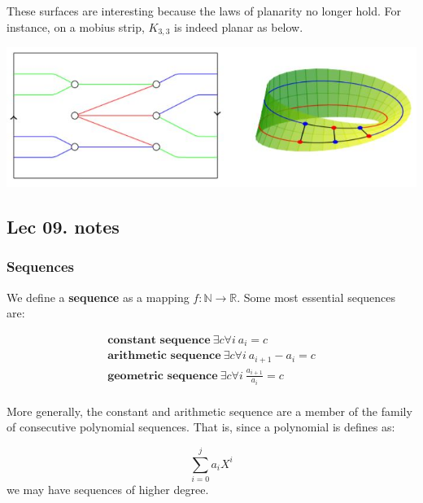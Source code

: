 \documentclass[titlepage]{article}
\theoremstyle{definition}
\numberwithin{equation}{subsection}
\numberwithin{remark}{subsection}
\begin{document}
These surfaces are interesting because the laws of planarity no longer hold. For instance, on a mobius strip, $K_{3,3}$ is indeed planar as below. 

 \begin{tcolorbox}[drop shadow, title=($K_{3,3}$ has become planar),lower separated=true]
    \centering
        \includegraphics[scale = 0.9,valign=t]{epflLectureNotes/advancedComputation/figures/mobiusk3.JPG}
\end{tcolorbox}

\subsection{Lec 09. notes}
\subsubsection{Sequences}
We define a \textbf{sequence} as a mapping $f: \mathbb{N} \to \mathbb{R}$. Some most essential sequences are:

\begin{align*}
    \textbf{constant sequence} \ \exists c \forall i \ a_{i} = c\\
    \textbf{arithmetic sequence} \ \exists c \forall i \ a_{i+1} - a_{i}  = c\\
    \textbf{geometric sequence} \ \exists c \forall i \ \frac{a_{i+1}}{a_{i}}= c
\end{align*}
\\
More generally, the constant and arithmetic sequence are a member of the family of consecutive polynomial sequences. That is, since a polynomial is defines as:

$$\sum_{i=0}^{j} a_{i}X^{i}$$ we may have sequences of higher degree. 
\end{document}
